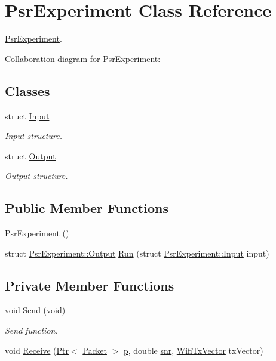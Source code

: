\hypertarget{classPsrExperiment}{}\section{Psr\+Experiment Class Reference}
\label{classPsrExperiment}


\hyperlink{classPsrExperiment}{Psr\+Experiment}.  




Collaboration diagram for Psr\+Experiment\+:
\subsection*{Classes}
\begin{DoxyCompactItemize}
\item 
struct \hyperlink{structPsrExperiment_1_1Input}{Input}
\begin{DoxyCompactList}\small\item\em \hyperlink{structPsrExperiment_1_1Input}{Input} structure. \end{DoxyCompactList}\item 
struct \hyperlink{structPsrExperiment_1_1Output}{Output}
\begin{DoxyCompactList}\small\item\em \hyperlink{structPsrExperiment_1_1Output}{Output} structure. \end{DoxyCompactList}\end{DoxyCompactItemize}
\subsection*{Public Member Functions}
\begin{DoxyCompactItemize}
\item 
\hyperlink{classPsrExperiment_a3d6c5e690722a4cdabfe1e2cfc59669d}{Psr\+Experiment} ()
\item 
struct \hyperlink{structPsrExperiment_1_1Output}{Psr\+Experiment\+::\+Output} \hyperlink{classPsrExperiment_abf2ccba462f7c6741034fcadcdd45900}{Run} (struct \hyperlink{structPsrExperiment_1_1Input}{Psr\+Experiment\+::\+Input} input)
\end{DoxyCompactItemize}
\subsection*{Private Member Functions}
\begin{DoxyCompactItemize}
\item 
void \hyperlink{classPsrExperiment_a82f6354f2941e255275bd638fc5f94a6}{Send} (void)
\begin{DoxyCompactList}\small\item\em Send function. \end{DoxyCompactList}\item 
void \hyperlink{classPsrExperiment_a885857fbaba11e93fb276f2b6255e0a0}{Receive} (\hyperlink{classns3_1_1Ptr}{Ptr}$<$ \hyperlink{classns3_1_1Packet}{Packet} $>$ \hyperlink{lte__link__budget__x2__handover__measures_8m_ac9de518908a968428863f829398a4e62}{p}, double \hyperlink{lte__pathloss_8m_ae6e82a215dff6b79fb6e9952a1b78453}{snr}, \hyperlink{classns3_1_1WifiTxVector}{Wifi\+Tx\+Vector} tx\+Vector)
\end{DoxyCompactItemize}
